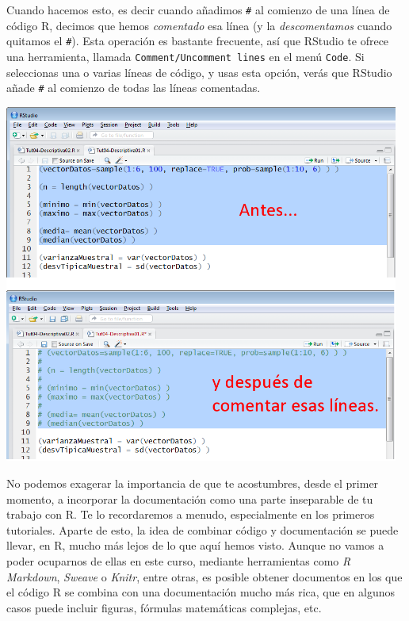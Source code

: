 \documentclass[10pt,a4paper]{article}\usepackage[]{graphicx}\usepackage[]{color}
\begin{document}
Cuando hacemos esto, es decir cuando añadimos \verb&#& al comienzo de una línea de código R, decimos que hemos {\em comentado} esa línea (y la {\em descomentamos} cuando quitamos el \verb&#&). Esta operación es bastante frecuente, así que RStudio te ofrece una herramienta, llamada {\tt Comment/Uncomment lines} en el menú {\tt Code}. Si seleccionas una o varias líneas de código, y usas esta opción, verás que RStudio añade \verb&#& al comienzo de todas las líneas comentadas.

    \begin{center}
    \includegraphics[width=13cm]{../fig/Tut04-07.png}
    \end{center}

No podemos exagerar la importancia de que te acostumbres, desde el primer momento, a incorporar la documentación como una parte inseparable de tu trabajo con R. Te lo recordaremos a menudo, especialmente en los primeros tutoriales. Aparte de esto, la idea de combinar código y documentación se puede llevar, en R, mucho más lejos de lo que aquí hemos visto. Aunque no vamos a poder ocuparnos de ellas en este curso, mediante herramientas como {\em R Markdown}, {\em Sweave} o {\em Knitr}, entre otras, es posible obtener documentos en los que el código R se combina con una documentación mucho más rica, que en algunos casos puede incluir figuras, fórmulas matemáticas complejas, etc.
\end{document}
